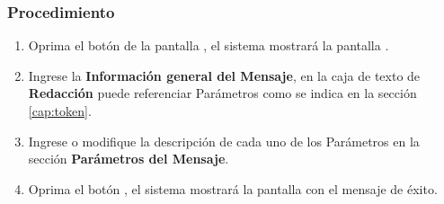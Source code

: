 	
\subsubsection{Procedimiento}
\begin{enumerate}
	\item Oprima el botón  de la pantalla , el sistema mostrará la pantalla . 

	
	\item Ingrese la \textbf{Información general del Mensaje}, en la caja de texto de {\bf Redacción} puede referenciar Parámetros como se indica en la sección \ref{cap:token}.
	
	\item Ingrese o modifique la descripción de cada uno de los Parámetros en la sección \textbf{Parámetros del Mensaje}.
	
	\item Oprima el botón , el sistema mostrará la pantalla  con el mensaje de éxito.
\end{enumerate}


